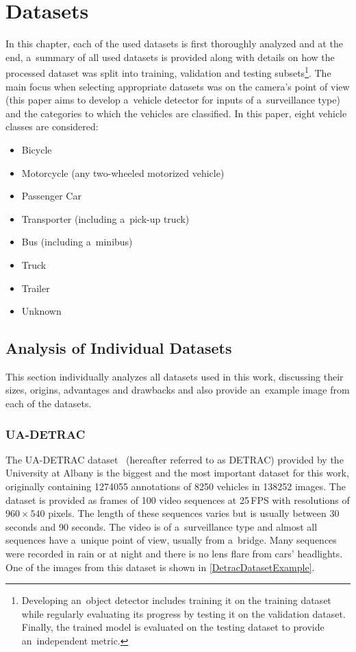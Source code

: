 \chapter{Datasets}
\label{DatasetsChapter}

In this chapter, each of the used datasets is first thoroughly analyzed and at
the end, a~summary of all used datasets is provided along with details on how
the processed dataset was split into training, validation and testing
subsets\footnote{Developing an~object detector includes training it on the
training dataset while regularly evaluating its progress by testing it on the
validation dataset. Finally, the trained model is evaluated on the testing
dataset to provide an~independent metric.}. The main focus when selecting
appropriate datasets was on the camera's point of view (this paper aims to
develop a~vehicle detector for inputs of a~surveillance type) and the categories
to which the vehicles are classified. In this paper, eight vehicle classes are
considered:
\begin{itemize}
    \item Bicycle
    \item Motorcycle (any two-wheeled motorized vehicle)
    \item Passenger Car
    \item Transporter (including a~pick-up truck)
    \item Bus (including a~minibus)
    \item Truck
    \item Trailer
    \item Unknown
\end{itemize}


\section{Analysis of Individual Datasets}

This section individually analyzes all datasets used in this work, discussing
their sizes, origins, advantages and drawbacks and also provide an~example image
from each of the datasets.


\subsection{UA-DETRAC}
\label{DetracDataset}

The UA-DETRAC dataset~\cite{detrac} (hereafter referred to as DETRAC) provided
by the University at Albany is the biggest and the most important dataset for
this work, originally containing \num{1274055} annotations of \num{8250}
vehicles in \num{138252} images. The dataset is provided as frames of 100 video
sequences at 25\,FPS with resolutions of $960 \times 540$ pixels. The length of
these sequences varies but is usually between 30 seconds and 90 seconds. The
video is of a~surveillance type and almost all sequences have a~unique point of
view, usually from a~bridge. Many sequences were recorded in rain or at night
and there is no lens flare from cars' headlights. One of the images from this
dataset is shown in \autoref{DetracDatasetExample}.

